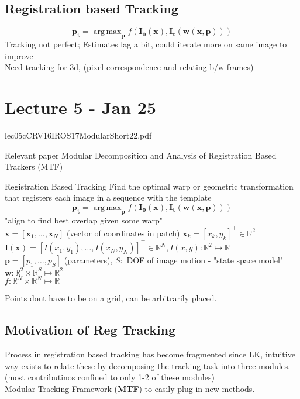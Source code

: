 \documentclass{article}
\DeclareMathOperator*{\argmax}{arg\,max}
\begin{document}
\subsection{Registration based Tracking}
\[
    \mathbf p_\mathbf t = \argmax_{\mathbf p} f(\mathbf I_\mathbf 0 (\mathbf x ), \mathbf I_\mathbf t (\mathbf w (\mathbf x, \mathbf p)))
\]
Tracking not perfect; Estimates lag a bit, could iterate more on same image to improve
\\
Need tracking for 3d, (pixel correspondence and relating b/w frames)









\section{Lecture 5 - Jan 25}
lec05cCRV16IROS17ModularShort22.pdf
\begin{refer}
    {Relevant paper}{}
    Modular Decomposition and Analysis of Registration Based Trackers (MTF)
\end{refer}
\begin{expln}
    {Registration Based Tracking}{}
    Find the optimal warp or geometric transformation that registers each image in a sequence with the template
    \[
        \mathbf{p_t} = \argmax_\mathbf p f(\mathbf{I_0}(\mathbf x), \mathbf{I_t}(\mathbf w (\mathbf x, \mathbf p)))
    \]
    "align to find best overlap given some warp"\\
    $\mathbf x = [\mathbf x_1, \ldots, \mathbf x_N]$ (vector of coordinates in patch)
    $\mathbf x_k = [x_k, y_k]^\top \in \mathbb R^2$
    \\
    $\mathbf{I(x)} = [I(x_1,y_1), \ldots, I(x_N,y_N)]^\top \in \mathbb R^{N}, I(x,y) : \mathbb R^2 \mapsto \mathbb R$ 
    \\
    $\mathbf p = [p_1, \ldots, p_S]$ (parameters), $S:$ DOF of image motion - "state space model"
    \\
    $\mathbf w : \mathbb R^2 \times \mathbb R ^S \mapsto \mathbb R^2$
    \\
    $f : \mathbb R^N \times \mathbb R^N \mapsto \mathbb R$
\end{expln}
\noindent
Points dont have to be on a grid, can be arbitrarily placed.
\subsection{Motivation of Reg Tracking}
Process in registration based tracking has become fragmented since LK, intuitive way exists
to relate these by decomposing the tracking task into three modules. 
(most contributinos confined to only 1-2 of these modules)\\
Modular Tracking Framework (\textbf{MTF}) to easily plug in new methods.
\end{document}
